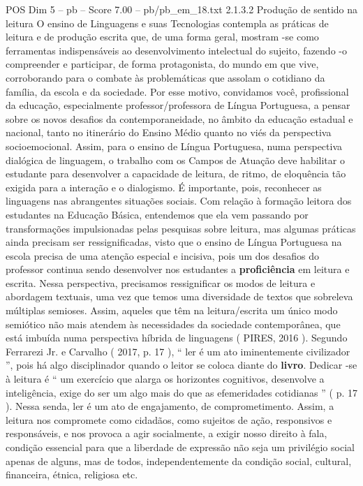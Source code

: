 \begin{textsample}{POS Dim 5 – pb – Score 7.00 – pb/pb\_em\_18.txt}  \label{ex:f5_pos_098}
2.1.3.2 Produção de sentido na leitura O ensino de Linguagens e suas Tecnologias contempla as práticas de leitura e de produção escrita que, de uma forma geral, mostram -se como ferramentas indispensáveis ao desenvolvimento intelectual do sujeito, fazendo -o compreender e participar, de forma protagonista, do mundo em que vive, corroborando para o combate às problemáticas que assolam o cotidiano da família, da escola e da sociedade.
Por esse motivo, convidamos você, profissional da educação, especialmente professor/professora de Língua Portuguesa, a pensar sobre os novos desafios da contemporaneidade, no âmbito da educação estadual e nacional, tanto no itinerário do Ensino Médio quanto no viés da perspectiva socioemocional.
Assim, para o ensino de Língua Portuguesa, numa perspectiva dialógica de linguagem, o trabalho com os Campos de Atuação deve habilitar o estudante para desenvolver a capacidade de leitura, de ritmo, de eloquência tão exigida para a interação e o dialogismo.
É importante, pois, reconhecer as linguagens nas abrangentes situações sociais.
Com relação à formação leitora dos estudantes na Educação Básica, entendemos que ela vem passando por transformações impulsionadas pelas pesquisas sobre leitura, mas algumas práticas ainda precisam ser ressignificadas, visto que o ensino de Língua Portuguesa na escola precisa de uma atenção especial e incisiva, pois um dos desafios do professor continua sendo desenvolver nos estudantes a \textbf{proficiência} em leitura e escrita.
Nessa perspectiva, precisamos ressignificar os modos de leitura e abordagem textuais, uma vez que temos uma diversidade de textos que sobreleva múltiplas semioses.
Assim, aqueles que têm na leitura/escrita um único modo semiótico não mais atendem às necessidades da sociedade contemporânea, que está imbuída numa perspectiva híbrida de linguagens ( PIRES, 2016 ).
Segundo Ferrarezi Jr. e Carvalho ( 2017, p. 17 ), “ ler é um ato iminentemente civilizador ”, pois há algo disciplinador quando o leitor se coloca diante do \textbf{livro}.
Dedicar -se à leitura é “ um exercício que alarga os horizontes cognitivos, desenvolve a inteligência, exige do ser um algo mais do que as efemeridades cotidianas ” ( p. 17 ).
Nessa senda, ler é um ato de engajamento, de comprometimento.
Assim, a leitura nos compromete como cidadãos, como sujeitos de ação, responsivos e responsáveis, e nos provoca a agir socialmente, a exigir nosso direito à fala, condição essencial para que a liberdade de expressão não seja um privilégio social apenas de alguns, mas de todos, independentemente da condição social, cultural, financeira, étnica, religiosa etc.

\end{textsample}
